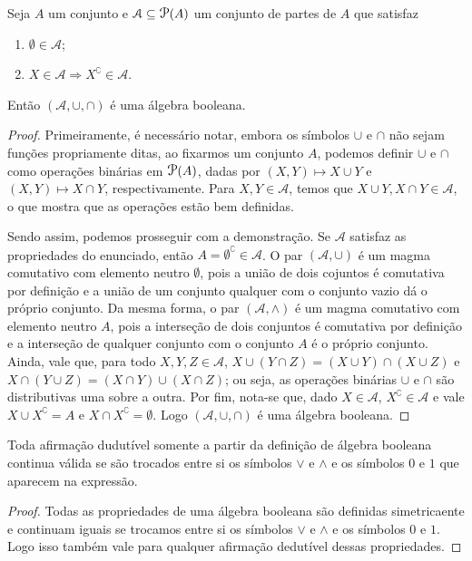 \begin{prop}
\label{prop:algeb.subconj}
	Seja $A$ um conjunto e $\mathcal A \subseteq \p(A)$ um conjunto de partes de $A$ que satisfaz
	\begin{enumerate}
	\item $\emptyset \in \mathcal A$;
	\item $X \in \mathcal A \Rightarrow X^\complement \in \mathcal A$.
	\end{enumerate}
Então $(\mathcal A,\cup,\cap)$ é uma álgebra booleana.
\end{prop}
\begin{proof}
	Primeiramente, é necessário notar, embora os símbolos $\cup$ e $\cap$ não sejam funções propriamente ditas, ao fixarmos um conjunto $A$, podemos definir $\cup$ e $\cap$ como operações binárias em $\p(A)$, dadas por $(X,Y) \mapsto X \cup Y$ e $(X,Y) \mapsto X \cap Y$, respectivamente. Para $X,Y \in \mathcal A$, temos que $X \cup Y,X \cap Y \in \mathcal A$, o que mostra que as operações estão bem definidas.

	Sendo assim, podemos prosseguir com a demonstração. Se $\mathcal A$ satisfaz as propriedades do enunciado, então $A = \emptyset^\complement \in \mathcal A$. O par $(\mathcal A,\cup)$ é um magma comutativo com elemento neutro $\emptyset$, pois a união de dois cojuntos é comutativa por definição e a união de um conjunto qualquer com o conjunto vazio dá o próprio conjunto. Da mesma forma, o par $(\mathcal A,\wedge)$ é um magma comutativo com elemento neutro $A$, pois a interseção de dois conjuntos é comutativa por definição e a interseção de qualquer conjunto com o conjunto $A$ é o próprio conjunto. Ainda, vale que, para todo $X,Y,Z \in \mathcal A$, $X \cup (Y \cap Z) = (X \cup Y) \cap (X \cup Z)$ e $X \cap (Y \cup Z) = (X \cap Y) \cup (X \cap Z)$; ou seja, as operações binárias $\cup$ e $\cap$ são distributivas uma sobre a outra. Por fim, nota-se que, dado $X \in \mathcal A$, $X^\complement \in \mathcal A$ e vale $X \cup X^\complement = A$ e $X \cap X^\complement = \emptyset$. Logo $(\mathcal A,\cup,\cap)$ é uma álgebra booleana.
\end{proof}

\begin{prop}
	Toda afirmação dudutível somente a partir da definição de álgebra booleana continua válida se são trocados entre si os símbolos $ \vee $ e $\wedge$ e os símbolos $0$ e $1$ que aparecem na expressão.
\end{prop}
\begin{proof}
	Todas as propriedades de uma álgebra booleana são definidas simetricaente e continuam iguais se trocamos entre si os símbolos $ \vee $ e $\wedge$ e os símbolos $0$ e $1$. Logo isso também vale para qualquer afirmação dedutível dessas propriedades.
\end{proof}

